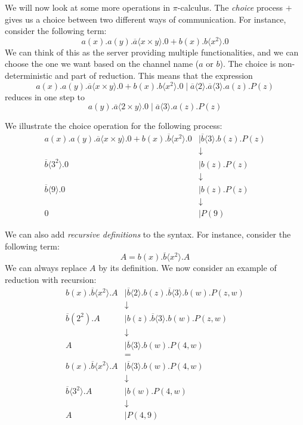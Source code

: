 \documentclass[a4paper, openany]{memoir}
\theoremstyle{definition}
\begin{document}
    We will now look at some more operations in $\pi$-calculus. The \emph{choice} process $+$ gives us a choice between two different ways of communication. For instance, consider the following term:
    \[a(x).a(y).\overline{a} \langle x \times y \rangle.0 + b(x).b\langle x^2 \rangle.0\]
    We can think of this as the server providing multiple functionalities, and we can choose the one we want based on the channel name ($a$ or $b$). The choice is non-deterministic and part of reduction. This means that the expression 
    \[a(x).a(y).\overline{a} \langle x \times y \rangle.0 + b(x).b\langle x^2 \rangle.0 \mid \overline{a} \langle 2 \rangle.\overline{a} \langle 3 \rangle.a(z).P(z)\]
    reduces in one step to
    \[a(y).\overline{a} \langle 2 \times y \rangle.0 \mid \overline{a} \langle 3 \rangle.a(z).P(z)\]

    We illustrate the choice operation for the following process:
    \begin{align*}
        a(x).a(y).\overline{a} \langle x \times y \rangle.0 + b(x).\overline{b}\langle x^2 \rangle.0 &\mid \overline{b} \langle 3 \rangle.b(z).P(z) \\
        &\downarrow \\
        \overline{b}\langle3^2\rangle.0 &\mid b(z).P(z) \\
        &\downarrow \\
        \overline{b}\langle 9 \rangle.0 &\mid b(z).P(z) \\
        &\downarrow \\
        0 &\mid P(9)
    \end{align*}

    We can also add \emph{recursive definitions} to the syntax. For instance, consider the following term:
    \[A = b(x).\overline{b}\langle x^2 \rangle.A\]
    We can always replace $A$ by its definition. We now consider an example of reduction with recursion:
    \begin{align*}
        b(x).\overline{b} \langle x^2 \rangle.A &\mid \overline{b} \langle 2 \rangle.b(z).\overline{b} \langle 3 \rangle.b(w).P(z, w) \\
        &\downarrow \\
        \overline{b}(2^2).A &\mid b(z).\overline{b} \langle 3 \rangle.b(w).P(z, w) \\
        &\downarrow \\
        A &\mid \overline{b} \langle 3 \rangle.b(w).P(4, w) \\
        &= \\
        b(x).\overline{b} \langle x^2 \rangle.A &\mid \overline{b} \langle 3 \rangle.b(w).P(4, w) \\
        &\downarrow \\ 
        \overline{b} \langle 3^2 \rangle.A &\mid b(w).P(4, w) \\
        &\downarrow \\
        A &\mid P(4, 9)
    \end{align*}
    
\end{document}
